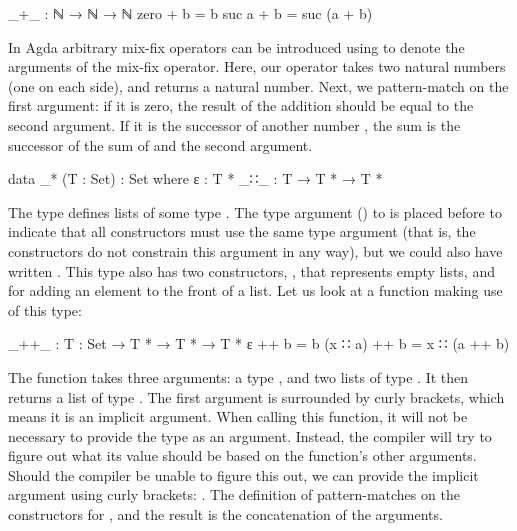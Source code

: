 		\begin{code}
			_+_ : ℕ → ℕ → ℕ
			zero   + b = b
			suc a  + b = suc (a + b)
		\end{code}

		In Agda arbitrary mix-fix operators can be introduced using \codett{\_}
		to denote the arguments of the mix-fix operator. Here, our operator
		\codett{\_+\_} takes two natural numbers (one on each side), and
		returns a natural number. Next, we pattern-match on the first argument:
		if it is zero, the result of the addition should be equal to the second
		argument. If it is the successor of another number , the sum
		is the successor of the sum of  and the second argument.

		\begin{code}
			data _* (T : Set) : Set where
			  ε    : T *
			  _∷_  : T → T * → T *
		\end{code}

		The type \codett{\_*} defines lists of some type . The type
		argument () to \codett{\_*} is placed before \codett{:}
		to indicate that all constructors must use the same type argument (that
		is, the constructors do not constrain this argument in any way), but we
		could also have written . This type
		also has two constructors, , that represents empty lists, and
		 for adding an element to the front of a list. Let us
		look at a function making use of this type:

		\begin{code}
			_++_ : {T : Set} → T * → T * → T *
			ε        ++ b = b
			(x ∷ a)  ++ b = x ∷ (a ++ b)
		\end{code}

		The function \codett{\_++\_} takes three arguments: a type ,
		and two lists of type . It then returns a list of type
		. The first argument is surrounded by curly brackets, which
		means it is an implicit argument. When calling this function, it will
		not be necessary to provide the type as an argument. Instead, the
		compiler will try to figure out what its value should be based on the
		function's other arguments. Should the compiler be unable to figure
		this out, we can provide the implicit argument using curly brackets:
		. The definition of \codett{\_++\_}
		pattern-matches on the constructors for , and the result is
		the concatenation of the arguments.

